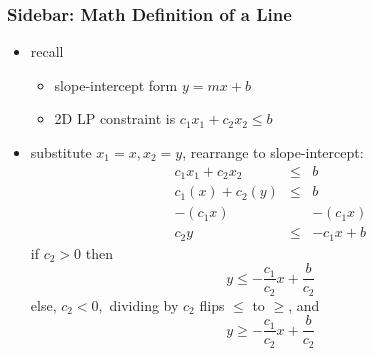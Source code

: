 \documentclass{beamer}
\begin{document}
\begin{frame} \frametitle{Sidebar: Math Definition of a Line}
  \begin{itemize}
    \item recall
    \begin{itemize}
    \item slope-intercept form $y=mx+b$
    \item 2D LP constraint is $c_1 x_1 + c_2 x_2 \leq b$
  \end{itemize}
  \item substitute $x_1=x, x_2=y$, rearrange to slope-intercept:
    \begin{eqnarray*}
      c_1 x_1 + c_2 x_2 &\leq& b \\
      c_1 (x) + c_2 (y) &\leq& b \\
      -(c_1 x) & & -(c_1 x) \\
      c_2 y &\leq& -c_1 x + b
    \end{eqnarray*}
    if $c_2 >0$ then
    \[ y \leq -\frac{c_1}{c_2}x + \frac{b}{c_2} \]
    else, $c_2<0,$ dividing by $c_2$ flips $\leq$ to $\geq$, and
    \[ y \geq -\frac{c_1}{c_2}x + \frac{b}{c_2} \]
  \end{itemize}
\end{frame}
\end{document}
